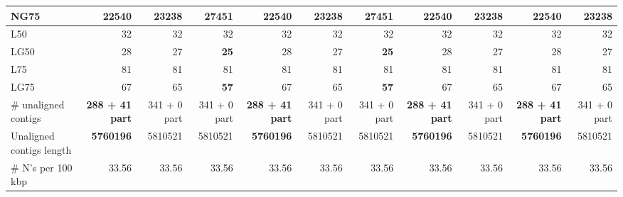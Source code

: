 \documentclass[12pt,a4paper]{article}
\begin{document}
\begin{table}[ht]
\begin{center}
\begin{tabular}{|l*{10}{|r}|}
NG75 & 22540 & 23238 & {\bf 27451} & 22540 & 23238 & {\bf 27451} & 22540 & 23238 & 22540 & 23238 \\ \hline
L50 & 32 & 32 & 32 & 32 & 32 & 32 & 32 & 32 & 32 & 32 \\ \hline
LG50 & 28 & 27 & {\bf 25} & 28 & 27 & {\bf 25} & 28 & 27 & 28 & 27 \\ \hline
L75 & 81 & 81 & 81 & 81 & 81 & 81 & 81 & 81 & 81 & 81 \\ \hline
LG75 & 67 & 65 & {\bf 57} & 67 & 65 & {\bf 57} & 67 & 65 & 67 & 65 \\ \hline
\# unaligned contigs & {\bf 288 + 41 part} & 341 + 0 part & 341 + 0 part & {\bf 288 + 41 part} & 341 + 0 part & 341 + 0 part & {\bf 288 + 41 part} & 341 + 0 part & {\bf 288 + 41 part} & 341 + 0 part \\ \hline
Unaligned contigs length & {\bf 5760196} & 5810521 & 5810521 & {\bf 5760196} & 5810521 & 5810521 & {\bf 5760196} & 5810521 & {\bf 5760196} & 5810521 \\ \hline
\# N's per 100 kbp & 33.56 & 33.56 & 33.56 & 33.56 & 33.56 & 33.56 & 33.56 & 33.56 & 33.56 & 33.56 \\ \hline
\end{tabular}
\end{center}
\end{table}
\end{document}
